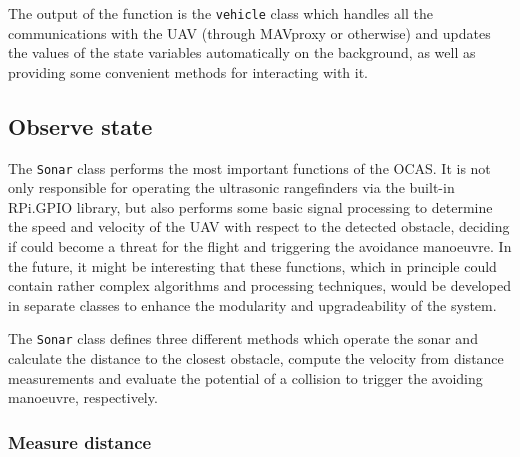 The output of the function is the \texttt{vehicle} class which handles all the communications with the UAV (through MAVproxy or otherwise) and updates the values of the state variables automatically on the background, as well as providing some convenient methods for interacting with it.

\subsection{Observe state} \label{sec:sonar}

The \texttt{Sonar} class performs the most important functions of the OCAS.
It is not only responsible for operating the ultrasonic rangefinders via the built-in RPi.GPIO library, but also performs some basic signal processing to determine the speed and velocity of the UAV with respect to the detected obstacle, deciding if could become a threat for the flight and triggering the avoidance manoeuvre.
In the future, it might be interesting that these functions, which in principle could contain rather complex algorithms and processing techniques, would be developed in separate classes to enhance the modularity and upgradeability of the system.

The \texttt{Sonar} class defines three different methods which operate the sonar and calculate the distance to the closest obstacle, compute the velocity from distance measurements and evaluate the potential of a collision to trigger the avoiding manoeuvre, respectively.

\subsubsection{Measure distance} \label{sec:measureDistance}

